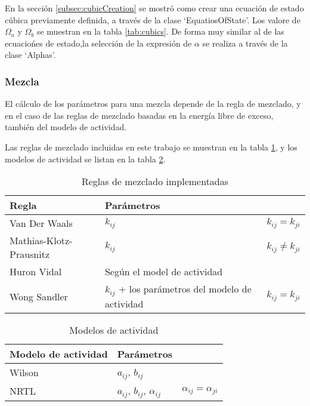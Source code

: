 En la sección \ref{subsec:cubicCreation} se mostró como crear una ecuación de estado cúbica previamente definida, a través de la clase `EquatiosOfState'. Los valore de $\Omega_a$ y $\Omega_b$ se muestran en la tabla \ref{tab:cubics}. De forma muy similar al de las ecuaciońes de estado,la selección de la expresión de $\alpha$ se realiza a través de la clase `Alphas'.




\subsubsection{Mezcla}\label{subsec:mixture}

El cálculo de los parámetros para una mezcla depende de la regla de mezclado, y en el caso de las reglas de mezclado basadas en la energía libre de exceso, también del modelo de actividad.

Las reglas de mezclado incluidas en este trabajo se muestran en la tabla \ref{tab:mixingrules}, y los modelos de actividad se listan en la tabla \ref{tab:activitymodels}.


\begin{table}
	\caption{Reglas de mezclado implementadas}\label{tab:mixingrules}
	\begin{tabularx}{\textwidth}{|X|X|X|}
		\hline
		Regla & Parámetros & \\
		\hline
		Van Der Waals & $k_{ij}$ & $k_{ij} = k_{ji}$ \\
		Mathias-Klotz-Prausnitz& $k_{ij}$ & $k_{ij} \neq k_{ji}$ \\
		Huron Vidal & Según el model de actividad & \\
		Wong Sandler & $k_{ij}$ + los parámetros del modelo de actividad & $k_{ij} = k_{ji}$ \\
		\hline
	\end{tabularx}
\end{table}

\begin{table}
	\caption{Modelos de actividad }\label{tab:activitymodels}
	\begin{tabularx}{\textwidth}{|X|X|X|}
		\hline
		Modelo de actividad & Parámetros & \\
		\hline
		Wilson & $a_{ij}$, $b_{ij}$  & \\
		NRTL & $a_{ij}$, $b_{ij}$, $\alpha_{ij}$ & $\alpha_{ij} = \alpha_{ji}$ \\
		\hline
	\end{tabularx}
\end{table}

